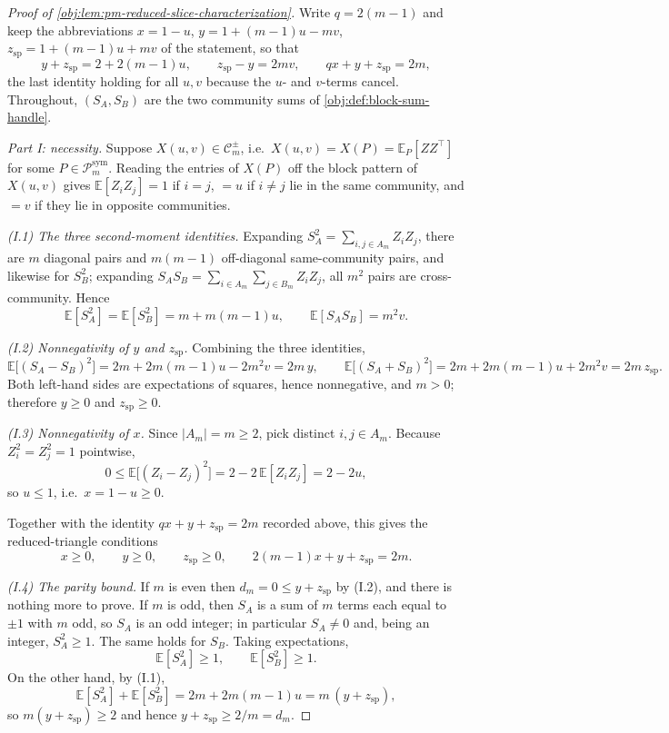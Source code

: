 \documentclass[11pt]{article}
\begin{document}
\begin{proof}[Proof of \cref{obj:lem:pm-reduced-slice-characterization}]
Write \(q=2(m-1)\) and keep the abbreviations \(x=1-u\), \(y=1+(m-1)u-mv\), \(z_{\mathrm{sp}}=1+(m-1)u+mv\) of the statement, so that
\[
y+z_{\mathrm{sp}}=2+2(m-1)u,
\qquad
z_{\mathrm{sp}}-y=2mv,
\qquad
qx+y+z_{\mathrm{sp}}=2m ,
\]
the last identity holding for all \(u,v\) because the \(u\)- and \(v\)-terms cancel.  Throughout, \((S_A,S_B)\) are the two community sums of \cref{obj:def:block-sum-handle}.


\emph{Part I: necessity.}  Suppose \(X(u,v)\in\mathcal C_m^{\pm}\), i.e.\ \(X(u,v)=X(P)=\mathbb E_P[ZZ^\top]\) for some \(P\in\mathcal P_m^{\mathrm{sym}}\).  Reading the entries of \(X(P)\) off the block pattern of \(X(u,v)\) gives \(\mathbb E[Z_iZ_j]=1\) if \(i=j\), \(=u\) if \(i\ne j\) lie in the same community, and \(=v\) if they lie in opposite communities.

\emph{(I.1) The three second-moment identities.}  Expanding \(S_A^2=\sum_{i,j\in A_m}Z_iZ_j\), there are \(m\) diagonal pairs and \(m(m-1)\) off-diagonal same-community pairs, and likewise for \(S_B^2\); expanding \(S_AS_B=\sum_{i\in A_m}\sum_{j\in B_m}Z_iZ_j\), all \(m^2\) pairs are cross-community.  Hence
\[
\mathbb E[S_A^2]=\mathbb E[S_B^2]=m+m(m-1)u,
\qquad
\mathbb E[S_AS_B]=m^2v .
\]

\emph{(I.2) Nonnegativity of \(y\) and \(z_{\mathrm{sp}}\).}  Combining the three identities,
\[
\mathbb E\bigl[(S_A-S_B)^2\bigr]
=2m+2m(m-1)u-2m^2v
=2m\,y,
\qquad
\mathbb E\bigl[(S_A+S_B)^2\bigr]
=2m+2m(m-1)u+2m^2v
=2m\,z_{\mathrm{sp}} .
\]
Both left-hand sides are expectations of squares, hence nonnegative, and \(m>0\); therefore \(y\ge0\) and \(z_{\mathrm{sp}}\ge0\). %

\emph{(I.3) Nonnegativity of \(x\).}  Since \(|A_m|=m\ge2\), pick distinct \(i,j\in A_m\).  Because \(Z_i^2=Z_j^2=1\) pointwise,
\[
0\le\mathbb E\bigl[(Z_i-Z_j)^2\bigr]=2-2\,\mathbb E[Z_iZ_j]=2-2u,
\]
so \(u\le1\), i.e.\ \(x=1-u\ge0\). %

Together with the identity \(qx+y+z_{\mathrm{sp}}=2m\) recorded above, this gives the reduced-triangle conditions
\[
x\ge0,\qquad y\ge0,\qquad z_{\mathrm{sp}}\ge0,\qquad
2(m-1)x+y+z_{\mathrm{sp}}=2m .
\]

\emph{(I.4) The parity bound.}  If \(m\) is even then \(d_m=0\le y+z_{\mathrm{sp}}\) by (I.2), and there is nothing more to prove.  If \(m\) is odd, then \(S_A\) is a sum of \(m\) terms each equal to \(\pm1\) with \(m\) odd, so \(S_A\) is an odd integer; in particular \(S_A\ne0\) and, being an integer, \(S_A^2\ge1\).  The same holds for \(S_B\).  Taking expectations,
\[
\mathbb E[S_A^2]\ge1,
\qquad
\mathbb E[S_B^2]\ge1 .
\]
On the other hand, by (I.1),
\[
\mathbb E[S_A^2]+\mathbb E[S_B^2]=2m+2m(m-1)u=m\,(y+z_{\mathrm{sp}}),
\]
so \(m(y+z_{\mathrm{sp}})\ge2\) and hence \(y+z_{\mathrm{sp}}\ge 2/m=d_m\). %



\end{proof}
\end{document}
